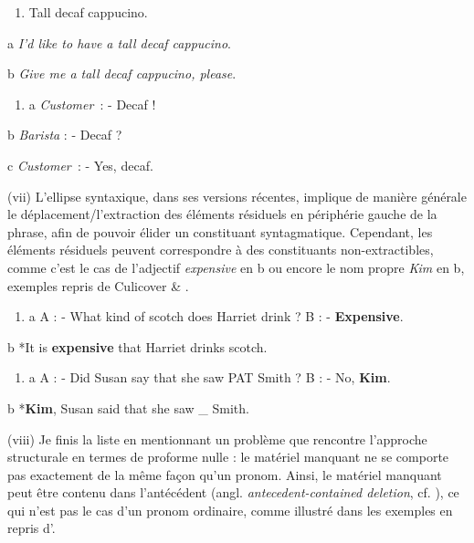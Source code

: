 \begin{enumerate}
\item   \label{bkm:Ref305675176}Tall decaf cappucino. 


\end{enumerate}
  a  \textit{I'd like to have a tall decaf cappucino}.

  b  \textit{Give me a tall decaf cappucino, please}. 


\begin{enumerate}
\item \label{bkm:Ref305674937}a  \textit{Customer~}: - Decaf ! 


\end{enumerate}
  b  \textit{Barista} : - Decaf ?

  c  \textit{Customer~}: - Yes, decaf. 

(vii) L'ellipse syntaxique, dans ses versions récentes, implique de manière générale le déplacement/l'extraction des éléments résiduels en périphérie gauche de la phrase, afin de pouvoir élider un constituant syntagmatique. Cependant, les éléments résiduels peuvent correspondre à des constituants non-extractibles, comme c'est le cas de l'adjectif \textit{expensive} en b ou encore le nom propre \textit{Kim} en b, exemples repris de Culicover \& \citet{Jackendoff2005}. 


\begin{enumerate}
\item \label{bkm:Ref306032243}a  A : - What kind of scotch does Harriet drink ? B : - \textbf{Expensive}. 


\end{enumerate}
  b  *It is \textbf{expensive} that Harriet drinks scotch.  


\begin{enumerate}
\item \label{bkm:Ref306032452}a  A : - Did Susan say that she saw PAT Smith ? B : - No, \textbf{Kim}. 


\end{enumerate}
  b  *\textbf{Kim}, Susan said that she saw \_ Smith.  

(viii) Je finis la liste en mentionnant un problème que rencontre l'approche structurale en termes de proforme nulle : le matériel manquant ne se comporte pas exactement de la même façon qu'un pronom. Ainsi, le matériel manquant peut être contenu dans l'antécédent (angl. \textit{antecedent-contained deletion}, cf. \citet{Sag1976}), ce qui n'est pas le cas d'un pronom ordinaire, comme illustré dans les exemples en  repris d'\citet{Aelbrecht2009}.


